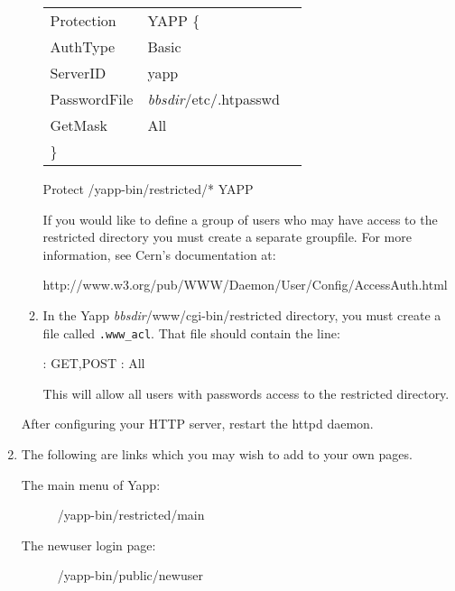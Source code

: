\documentclass[twoside]{report}
\begin{document}
\begin{enumerate}
\begin{enumerate}
                  {\centering         
                  \begin{tabular} {lll}
                  Protection&   YAPP    \{\\
                  AuthType&     Basic\\
                  ServerID&     yapp\\
                  PasswordFile& {\em bbsdir}/etc/.htpasswd\\
                  GetMask&         All\\
                  \}& \  \\
                  \end{tabular}

                  Protect /yapp-bin/restricted/*  YAPP\\
                  }

                  If you would like to define a group of users who may have 
                  access to the restricted directory you must create a 
                  separate groupfile.  For more information, see Cern's 
                  documentation at:

   {\centering http://www.w3.org/pub/WWW/Daemon/User/Config/AccessAuth.html\\ }

            \item In the Yapp {\em bbsdir}/www/cgi-bin/restricted directory, 
                  you must create a file called 
                  {\tt .www\_acl}. That file should contain 
                  the line: 

                     {\centering * : GET,POST : All\\}

                  This will allow all users with passwords access to the 
                  restricted directory.
         \end{enumerate}

         After configuring your HTTP server, restart the httpd daemon.

   \item The following are links which you may wish to add to your own pages.
         \begin{description}
         \item [The main menu of Yapp:]
             /yapp-bin/restricted/main
   
         \item [The newuser login page:]
             /yapp-bin/public/newuser
   

\end{description}
\end{enumerate}
\end{document}
